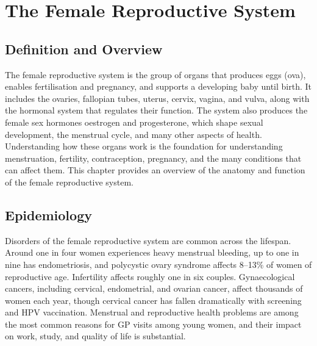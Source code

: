\chapter{The Female Reproductive System}

\section*{Definition and Overview}
The female reproductive system is the group of organs that produces eggs (ova), enables fertilisation and pregnancy, and supports a developing baby until birth. It includes the ovaries, fallopian tubes, uterus, cervix, vagina, and vulva, along with the hormonal system that regulates their function. The system also produces the female sex hormones oestrogen and progesterone, which shape sexual development, the menstrual cycle, and many other aspects of health. Understanding how these organs work is the foundation for understanding menstruation, fertility, contraception, pregnancy, and the many conditions that can affect them. This chapter provides an overview of the anatomy and function of the female reproductive system.

\section*{Epidemiology}
Disorders of the female reproductive system are common across the lifespan. Around one in four women experiences heavy menstrual bleeding, up to one in nine has endometriosis, and polycystic ovary syndrome affects 8--13\% of women of reproductive age. Infertility affects roughly one in six couples. Gynaecological cancers, including cervical, endometrial, and ovarian cancer, affect thousands of women each year, though cervical cancer has fallen dramatically with screening and HPV vaccination. Menstrual and reproductive health problems are among the most common reasons for GP visits among young women, and their impact on work, study, and quality of life is substantial.

